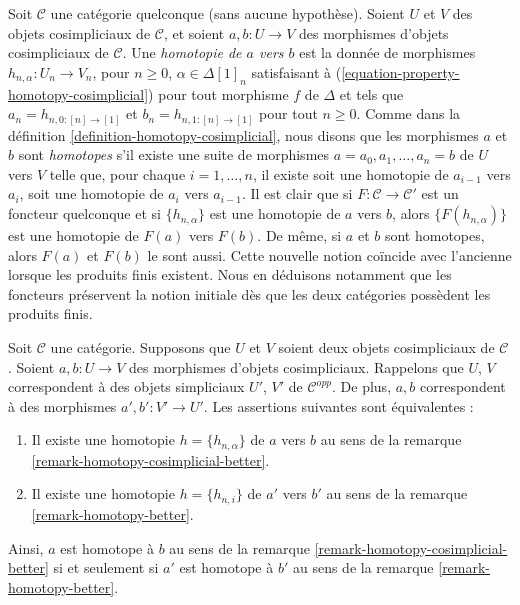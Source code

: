 \begin{remark}
\label{remark-homotopy-cosimplicial-better}
Soit $\mathcal{C}$ une catégorie quelconque (sans aucune hypothèse).
Soient $U$ et $V$ des objets cosimpliciaux de $\mathcal{C}$, et soient
$a, b : U \to V$ des morphismes d'objets cosimpliciaux de $\mathcal{C}$.
Une {\it homotopie de $a$ vers $b$} est la donnée de morphismes
$h_{n, \alpha} : U_n \to V_n$, pour $n \geq 0$, $\alpha \in \Delta[1]_n$
satisfaisant à (\ref{equation-property-homotopy-cosimplicial})
pour tout morphisme $f$ de $\Delta$ et tels que
$a_n = h_{n, 0 : [n] \to [1]}$ et $b_n = h_{n, 1 : [n] \to [1]}$
pour tout $n \geq 0$.
Comme dans la définition \ref{definition-homotopy-cosimplicial},
nous disons que les morphismes $a$ et $b$ sont {\it homotopes} s'il existe
une suite de morphismes $a = a_0, a_1, \ldots, a_n = b$ de $U$ vers $V$
telle que, pour chaque $i = 1, \ldots, n$, il existe soit une homotopie de
$a_{i - 1}$ vers $a_i$, soit une homotopie de $a_i$ vers $a_{i - 1}$.
Il est clair que si $F : \mathcal{C} \to \mathcal{C}'$ est un foncteur
quelconque et si $\{h_{n, \alpha}\}$ est une homotopie de $a$ vers $b$, alors
$\{F(h_{n, \alpha})\}$ est une homotopie de $F(a)$ vers $F(b)$.
De même, si $a$ et $b$ sont homotopes, alors $F(a)$ et $F(b)$ le sont aussi.
Cette nouvelle notion coïncide avec l'ancienne lorsque les produits finis
existent. Nous en déduisons notamment que les foncteurs préservent la notion
initiale dès que les deux catégories possèdent les produits finis.
\end{remark}

\begin{lemma}
\label{lemma-compare-homotopies}
Soit $\mathcal{C}$ une catégorie. Supposons que $U$ et $V$ soient deux
objets cosimpliciaux de $\mathcal{C}$. Soient $a, b : U \to V$ des morphismes
d'objets cosimpliciaux. Rappelons que $U$, $V$ correspondent à des objets
simpliciaux $U'$, $V'$ de $\mathcal{C}^{opp}$.
De plus, $a, b$ correspondent à des morphismes $a', b' : V' \to U'$.
Les assertions suivantes sont équivalentes :
\begin{enumerate}
\item Il existe une homotopie $h = \{h_{n, \alpha}\}$ de
$a$ vers $b$ au sens de la remarque \ref{remark-homotopy-cosimplicial-better}.
\item Il existe une homotopie $h = \{h_{n, i}\}$ de $a'$ vers $b'$
au sens de la remarque \ref{remark-homotopy-better}.
\end{enumerate}
Ainsi, $a$ est homotope à $b$ au sens de la
remarque \ref{remark-homotopy-cosimplicial-better} si et seulement si
$a'$ est homotope à $b'$ au sens de la
remarque \ref{remark-homotopy-better}.
\end{lemma}

